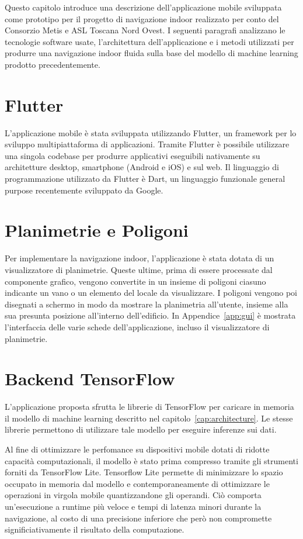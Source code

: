 
Questo capitolo introduce una descrizione dell'applicazione mobile sviluppata
come prototipo per il progetto di navigazione indoor realizzato per conto del
Consorzio Metis e ASL Toscana Nord Ovest. I seguenti paragrafi analizzano le
tecnologie software usate, l'architettura dell'applicazione e i metodi
utilizzati per produrre una navigazione indoor fluida sulla base del modello di
machine learning prodotto precedentemente.
\section{Flutter}
L'applicazione mobile è stata sviluppata utilizzando 
Flutter\cite{flutter}, un framework per lo sviluppo multipiattaforma di
applicazioni. Tramite Flutter è possibile utilizzare una singola codebase per
produrre applicativi eseguibili nativamente su architetture desktop, smartphone
(Android e iOS) e sul web. Il linguaggio di programmazione utilizzato da Flutter
è Dart, un linguaggio funzionale general purpose recentemente sviluppato da
Google.
\section{Planimetrie e Poligoni}
Per implementare la navigazione indoor, l'applicazione è stata dotata di un
visualizzatore di planimetrie. Queste ultime, prima di essere processate dal
componente grafico, vengono convertite in un insieme di poligoni ciasuno
indicante un vano o un elemento del locale da visualizzare. I poligoni vengono
poi disegnati a schermo in modo da mostrare la planimetria all'utente, insieme
alla sua presunta posizione all'interno dell'edificio. In
Appendice~\ref{app:gui} è mostrata l'interfaccia delle varie schede
dell'applicazione, incluso il visualizzatore di planimetrie.
\section{Backend TensorFlow}
L'applicazione proposta sfrutta le librerie di TensorFlow per caricare in
memoria il modello di machine learning descritto nel
capitolo~\ref{cap:architecture}. Le stesse librerie permettono di utilizzare
tale modello per eseguire inferenze sui dati. 

Al fine di ottimizzare le perfomance su dispositivi mobile dotati di ridotte
capacità computazionali, il modello è stato prima compresso tramite gli
strumenti forniti da TensorFlow Lite\cite{tensorflow-lite}. Tensorflow Lite
permette di minimizzare lo spazio occupato in memoria dal modello e
contemporaneamente di ottimizzare le operazioni in virgola mobile
quantizzandone gli operandi. Ciò comporta un'esecuzione a runtime più veloce e
tempi di latenza minori durante la navigazione, al costo di una precisione
inferiore che però non compromette significiativamente il risultato della
computazione.

